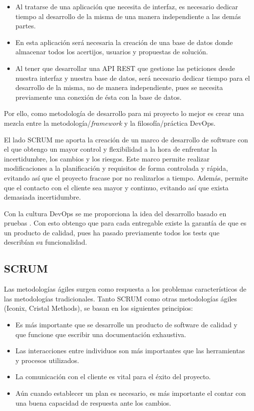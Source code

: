 \begin{itemize}
    \item Al tratarse de una aplicación que necesita de interfaz, es necesario dedicar tiempo al desarrollo de la misma de una manera independiente a las demás partes. 
    \item En esta aplicación será necesaria la creación de una base de datos donde almacenar todos los acertijos, usuarios y propuestas de solución.
    \item Al tener que desarrollar una API REST que gestione las peticiones desde nuestra interfaz y nuestra base de datos, será necesario dedicar tiempo para el desarrollo de la misma, no de manera independiente, pues se necesita previamente una conexión de ésta con la base de datos.
\end{itemize}

Por ello, como metodología de desarrollo para mi proyecto lo mejor es crear una mezcla entre la metodología/\textit{framework}  y la filosofía/práctica DevOps.

El lado SCRUM me aporta la creación de un marco de desarrollo de software con el que obtengo un mayor control y flexibilidad a la hora de enfrentar la incertidumbre, los cambios y los riesgos. Este marco permite realizar modificaciones a la planificación y requisitos de forma controlada y rápida, evitando así que el proyecto fracase por no realizarlos a tiempo. Además, permite que el contacto con el cliente sea mayor y continuo, evitando así que exista demasiada incertidumbre.

Con la cultura DevOps se me proporciona la idea del desarrollo basado en pruebas \cite{desarrollotests}\cite{desarrollotests2}. Con esto obtengo que para cada entregable existe la garantía de que es un producto de calidad, pues ha pasado previamente todos los tests que describían su funcionalidad.

\subsection{SCRUM}

Las metodologías ágiles surgen como respuesta a los problemas característicos de las metodologías tradicionales. Tanto SCRUM como otras metodologías ágiles (Iconix, Cristal Methods), se basan en los siguientes principios:

\begin{itemize}
    \item Es más importante que se desarrolle un producto de software de calidad y que funcione que escribir una documentación exhaustiva. 
    \item Las interacciones entre individuos son más importantes que las herramientas y procesos utilizados.
    \item La comunicación con el cliente es vital para el éxito del proyecto.
    \item Aún cuando establecer un plan es necesario, es más importante el contar con una buena capacidad de respuesta ante los cambios.
\end{itemize}

